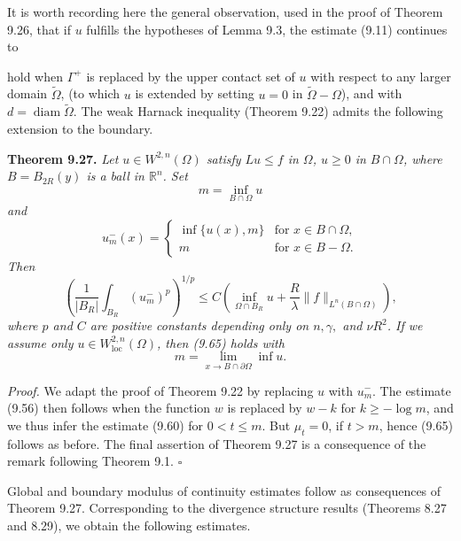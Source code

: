It is worth recording here the general observation, used in the proof of Theorem
9.26, that if $u$ fulfills the hypotheses of Lemma 9.3, the estimate (9.11) continues to



hold when $\Gamma^{+}$ is replaced by the upper contact set of $u$ with respect to any larger domain $\widetilde{\Omega}$, (to which $u$ is extended by setting $u=0$ in $\widetilde{\Omega}-\Omega$), and with $d=\operatorname{diam}\widetilde{\Omega}$.
The weak Harnack inequality (Theorem 9.22) admits the following extension to the boundary.

\medskip

\noindent\textbf{Theorem 9.27.} \textit{Let $u\in W^{2,n}(\Omega)$ satisfy $Lu\le f$ in $\Omega$, $u\ge 0$ in $B\cap\Omega$, where $B=B_{2R}(y)$ is a ball in $\mathbb{R}^n$. Set}
\[
m=\inf_{B\cap\Omega}u
\]
\textit{and}
\[
u_m^{-}(x)=
\begin{cases}
\inf\{u(x),m\} & \text{for } x\in B\cap\Omega,\\
m & \text{for } x\in B-\Omega.
\end{cases}
\]
\textit{Then}
\begin{equation}
\left(\frac{1}{|B_R|}\int_{B_R}(u_m^{-})^p\right)^{1/p}
\le
C\left(\inf_{\Omega\cap B_R}u+\frac{R}{\lambda}\|f\|_{L^n(B\cap\Omega)}\right),
\tag{9.65}
\end{equation}
\textit{where $p$ and $C$ are positive constants depending only on $n,\gamma,$ and $\nu R^2$. If we assume only $u\in W^{2,n}_{\mathrm{loc}}(\Omega)$, then (9.65) holds with}
\[
m=\lim_{x\to B\cap\partial\Omega}\inf u.
\]

\medskip

\noindent\textit{Proof.} We adapt the proof of Theorem 9.22 by replacing $u$ with $u_m^{-}$. The estimate (9.56) then follows when the function $w$ is replaced by $w-k$ for $k\ge -\log m$, and we thus infer the estimate (9.60) for $0<t\le m$. But $\mu_t=0$, if $t>m$, hence (9.65) follows as before. The final assertion of Theorem 9.27 is a consequence of the remark following Theorem 9.1. $\square$

\medskip

Global and boundary modulus of continuity estimates follow as consequences of Theorem 9.27. Corresponding to the divergence structure results (Theorems 8.27 and 8.29), we obtain the following estimates.

\medskip

